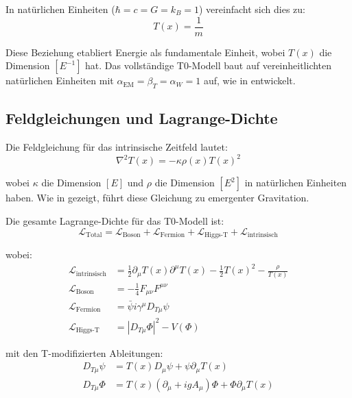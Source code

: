 \documentclass[12pt,a4paper]{article}
\begin{document}
	In natürlichen Einheiten ($\hbar = c = G = k_B = 1$) vereinfacht sich dies zu:
	\begin{equation}
		T(x) = \frac{1}{m}
		\label{eq:natural_units_time}
	\end{equation}
	
	Diese Beziehung etabliert Energie als fundamentale Einheit, wobei $T(x)$ die Dimension $[E^{-1}]$ hat. Das vollständige T0-Modell baut auf vereinheitlichten natürlichen Einheiten mit $\alpha_{\text{EM}} = \beta_T = \alpha_W = 1$ auf, wie in \cite{Pascher2025Alpha1Beta1} entwickelt.
	
	\subsection{Feldgleichungen und Lagrange-Dichte}
	\label{subsec:field_equations}
	
	Die Feldgleichung für das intrinsische Zeitfeld lautet:
	\begin{equation}
		\nabla^2 T(x) = -\kappa\rho(x)T(x)^2
		\label{eq:field_equation}
	\end{equation}
	
	wobei $\kappa$ die Dimension $[E]$ und $\rho$ die Dimension $[E^2]$ in natürlichen Einheiten haben. Wie in \cite{Pascher2025EmergentGrav} gezeigt, führt diese Gleichung zu emergenter Gravitation.
	
	Die gesamte Lagrange-Dichte für das T0-Modell ist:
	\begin{equation}
		\mathcal{L}_{\text{Total}} = \mathcal{L}_{\text{Boson}} + \mathcal{L}_{\text{Fermion}} + \mathcal{L}_{\text{Higgs-T}} + \mathcal{L}_{\text{intrinsisch}}
		\label{eq:total_lagrangian}
	\end{equation}
	
	wobei:
	\begin{align}
		\mathcal{L}_{\text{intrinsisch}} &= \frac{1}{2}\partial_{\mu}T(x)\partial^{\mu}T(x) - \frac{1}{2}T(x)^2 - \frac{\rho}{T(x)} \label{eq:intrinsic_lagrangian} \\
		\mathcal{L}_{\text{Boson}} &= -\frac{1}{4}F_{\mu\nu}F^{\mu\nu} \label{eq:boson_lagrangian} \\
		\mathcal{L}_{\text{Fermion}} &= \bar{\psi}i\gamma^{\mu}D_{T\mu}\psi \label{eq:fermion_lagrangian} \\
		\mathcal{L}_{\text{Higgs-T}} &= |D_{T\mu}\Phi|^2 - V(\Phi) \label{eq:higgs_lagrangian}
	\end{align}
	
	mit den T-modifizierten Ableitungen:
	\begin{align}
		D_{T\mu}\psi &= T(x)D_{\mu}\psi + \psi\partial_{\mu}T(x) \label{eq:t_modified_derivative} \\
		D_{T\mu}\Phi &= T(x)(\partial_{\mu} + igA_{\mu})\Phi + \Phi\partial_{\mu}T(x) \label{eq:higgs_t_derivative}
	\end{align}
	
\end{document}
